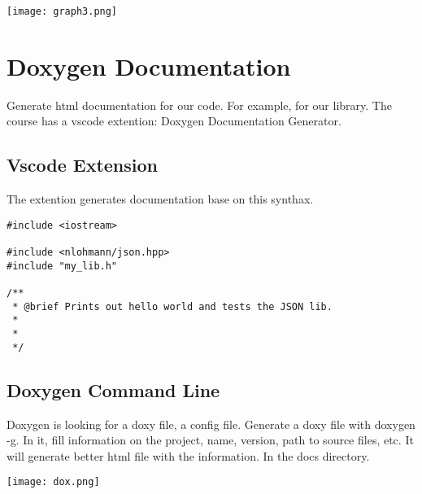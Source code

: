 \begin{center}
    \texttt{[image: graph3.png]}
\end{center}



\section{Doxygen Documentation}

Generate html documentation for our code. For example, for our library. The course has a vscode extention: Doxygen Documentation Generator.

\subsection{Vscode Extension}

The extention generates documentation base on this synthax.

\begin{verbatim}
#include <iostream>

#include <nlohmann/json.hpp>
#include "my_lib.h"

/**
 * @brief Prints out hello world and tests the JSON lib.
 *
 *
 */
\end{verbatim}

\subsection{Doxygen Command Line}

Doxygen is looking for a doxy file, a config file. Generate a doxy file with doxygen -g.
In it, fill information on the project, name, version,  path to source files, etc. It will generate better html file with the information.
In the docs directory.

\begin{center}
    \texttt{[image: dox.png]}
\end{center}

